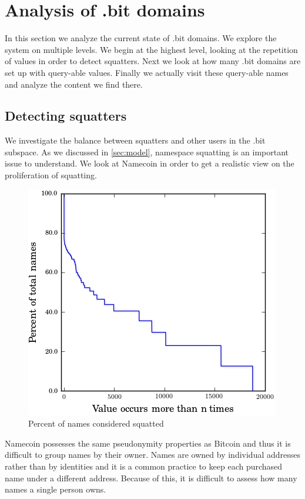 \section{Analysis of .bit domains}
\label{sec:domains}

In this section we analyze the current state of .bit domains. We explore the system on multiple levels. We begin at the highest level, looking at the repetition of values in order to detect squatters. Next we look at how many .bit domains are set up with query-able values. Finally we actually visit these query-able names and analyze the content we find there.

\subsection{Detecting squatters}

We investigate the balance between squatters and other users in the .bit subspace. As we discussed in \ref{sec:model}, namespace squatting is an important issue to understand. We look at Namecoin in order to get a realistic view on the proliferation of squatting.

\begin{figure}
  \centering
  \includegraphics[width=0.9\columnwidth]{figures/squatters}
  \caption{Percent of names considered squatted}
  \label{fig:percentSquatter}
\end{figure}

Namecoin possesses the same pseudonymity properties as Bitcoin and thus it is difficult to group names by their owner. Names are owned by individual addresses rather than by identities and it is a common practice to keep each purchased name under a different address. Because of this, it is difficult to assess how many names a single person owns. 

